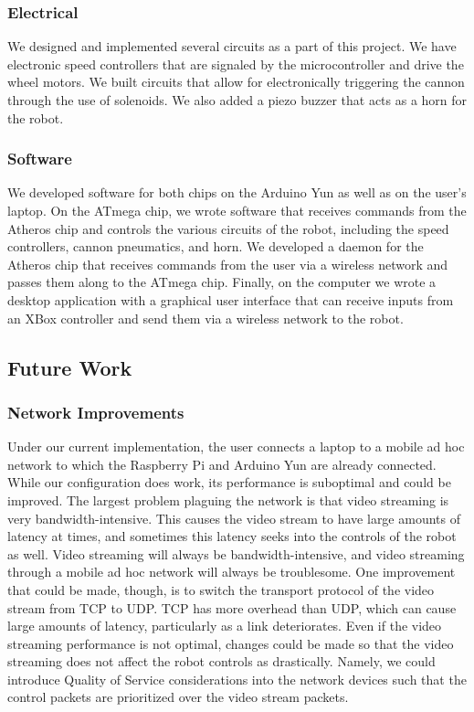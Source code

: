 \documentclass[letterpaper,12pt]{article}
\begin{document}
\subsubsection{Electrical}
We designed and implemented several circuits as a part of this project. We have
electronic speed controllers that are signaled by the microcontroller and drive
the wheel motors. We built circuits that allow for electronically triggering the
cannon through the use of solenoids. We also added a piezo buzzer that acts as a
horn for the robot.

\subsubsection{Software}
We developed software for both chips on the Arduino Yun as well as on the user's
laptop. On the ATmega chip, we wrote software that receives commands from the
Atheros chip and controls the various circuits of the robot, including the speed
controllers, cannon pneumatics, and horn. We developed a daemon for the Atheros
chip that receives commands from the user via a wireless network and passes them
along to the ATmega chip. Finally, on the computer we wrote a desktop
application with a graphical user interface that can receive inputs from an XBox
controller and send them via a wireless network to the robot.

\subsection{Future Work}
\subsubsection{Network Improvements}
Under our current implementation, the user connects a laptop to a mobile ad hoc
network to which the Raspberry Pi and Arduino Yun are already connected. While
our configuration does work, its performance is suboptimal and could be
improved. The largest problem plaguing the network is that video streaming is
very bandwidth-intensive. This causes the video stream to have large amounts of
latency at times, and sometimes this latency seeks into the controls of the
robot as well. Video streaming will always be bandwidth-intensive, and video
streaming through a mobile ad hoc network will always be troublesome. One
improvement that could be made, though, is to switch the transport protocol of
the video stream from TCP to UDP. TCP has more overhead than UDP, which can
cause large amounts of latency, particularly as a link deteriorates. Even if the
video streaming performance is not optimal, changes could be made so that the
video streaming does not affect the robot controls as drastically. Namely, we
could introduce Quality of Service considerations into the network devices such
that the control packets are prioritized over the video stream packets.
\end{document}
